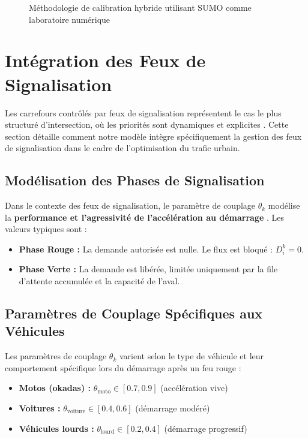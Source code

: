 \begin{figure}[htbp]
\centering
\caption{Méthodologie de calibration hybride utilisant SUMO comme laboratoire numérique}
\label{fig:calibration_hybride}
\end{figure}

\section{Intégration des Feux de Signalisation}
Les carrefours contrôlés par feux de signalisation représentent le cas le plus structuré d'intersection, où les priorités sont dynamiques et explicites \cite{BandRascle2009}. Cette section détaille comment notre modèle intègre spécifiquement la gestion des feux de signalisation dans le cadre de l'optimisation du trafic urbain.

\subsection{Modélisation des Phases de Signalisation}
Dans le contexte des feux de signalisation, le paramètre de couplage $ \theta_k $ modélise la \textbf{performance et l'agressivité de l'accélération au démarrage} \cite{JinZhang2003}. Les valeurs typiques sont :
\begin{itemize}
    \item \textbf{Phase Rouge :} La demande autorisée est nulle. Le flux est bloqué : $ D_i^k = 0 $.
    \item \textbf{Phase Verte :} La demande est libérée, limitée uniquement par la file d'attente accumulée et la capacité de l'aval.
\end{itemize}

\subsection{Paramètres de Couplage Spécifiques aux Véhicules}
Les paramètres de couplage $ \theta_k $ varient selon le type de véhicule et leur comportement spécifique lors du démarrage après un feu rouge :
\begin{itemize}
    \item \textbf{Motos (okadas) :} $ \theta_{\text{moto}} \in [0.7, 0.9] $ (accélération vive)
    \item \textbf{Voitures :} $ \theta_{\text{voiture}} \in [0.4, 0.6] $ (démarrage modéré)
    \item \textbf{Véhicules lourds :} $ \theta_{\text{lourd}} \in [0.2, 0.4] $ (démarrage progressif)
\end{itemize}

